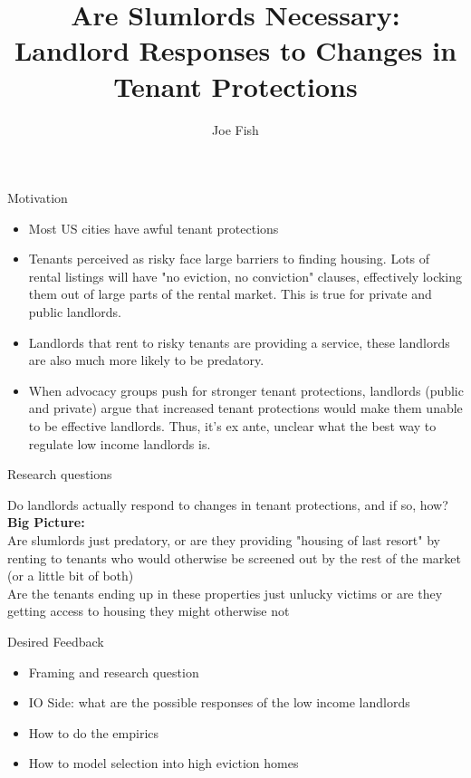 \documentclass[10pt, xcolor=dvipsnames]{beamer}
\date{}
\title[Landlord Responses to Changes in Tenant Protections]{Are Slumlords Necessary: \\Landlord Responses to Changes in Tenant Protections} %
\author[Joe Fish]{Joe Fish}
\begin{document}
\begin{frame}
\titlepage %
\end{frame}

\begin{frame}{Motivation}

\begin{itemize}
    \item Most US cities have awful tenant protections
    \item Tenants perceived as risky face large barriers to finding housing. Lots of rental listings will have "no eviction, no conviction" clauses, effectively locking them out of large parts of the rental market. This is true for private and public landlords.
    \item Landlords that rent to risky tenants are providing a service, these landlords are also much more likely to be predatory.
    \item When advocacy groups push for stronger tenant protections, landlords (public and private) argue that increased tenant protections would make them unable to be effective landlords. Thus, it's ex ante, unclear what the best way to regulate low income landlords is.
\end{itemize}
\end{frame}


\begin{frame}{Research questions}

Do landlords actually respond to changes in tenant protections, and if so, how?\\
\vspace{0.5cm}
\textbf{Big Picture:} \\
\vspace{0.5cm}
Are slumlords just predatory, or are they providing "housing of last resort" by renting to tenants who would otherwise be screened out by the rest of the market (or a little bit of both) \\
\vspace{0.5cm}
Are the tenants ending up in these properties just unlucky victims or are they getting access to housing they might otherwise not

\end{frame}

\begin{frame}{Desired Feedback}
\begin{itemize}
    \item Framing and research question
    \item IO Side: what are the possible responses of the low income landlords
    \item How to do the empirics
    \item How to model selection into high eviction homes
\end{itemize}
    
\end{frame}
\end{document}
